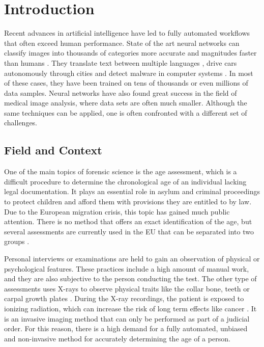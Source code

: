 \section{Introduction}

Recent advances in artificial intelligence have led to fully automated workflows that often exceed human performance. State of the art neural networks can classify images into thousands of categories more accurate and magnitudes faster than humans \cite{He2015a}. They translate text between multiple languages \cite{Wu2016}, drive cars autonomously through cities \cite{Bojarski2017} and detect malware in computer systems \cite{Saxe2015}. In most of these cases, they have been trained on tens of thousands or even millions of data samples. Neural networks have also found great success in the field of medical image analysis, where data sets are often much smaller. Although the same techniques can be applied, one is often confronted with a different set of challenges.

\subsection{Field and Context}

One of the main topics of forensic science is the age assessment, which is a difficult procedure to determine the chronological age of an individual lacking legal documentation. It plays an essential role in asylum and criminal proceedings to protect children and afford them with provisions they are entitled to by law. Due to the European migration crisis, this topic has gained much public attention. There is no method that offers an exact identification of the age, but several assessments are currently used in the EU that can be separated into two groups \cite{EuropeanAsylumSupportOffice2013}.

Personal interviews or examinations are held to gain an observation of physical or psychological features. These practices include a high amount of manual work, and they are also subjective to the person conducting the test. The other type of assessments uses X-rays to observe physical traits like the collar bone, teeth or carpal growth plates \cite{EuropeanAsylumSupportOffice2013}. During the X-ray recordings, the patient is exposed to ionizing radiation, which can increase the risk of long term effects like cancer \cite{WorldHealthOrganization2016}. It is an invasive imaging method that can only be performed as part of a judicial order. For this reason, there is a high demand for a fully automated, unbiased and non-invasive method for accurately determining the age of a person.

